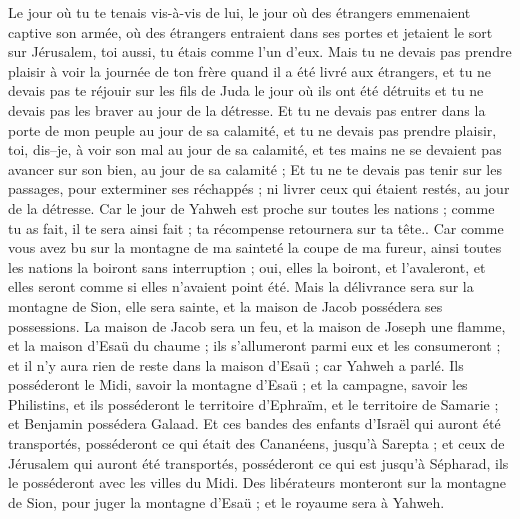 \begin{multicols}{2}
Le jour où tu te tenais vis-à-vis de lui, le jour où des étrangers emmenaient captive son armée, où des étrangers entraient dans ses portes et jetaient le sort sur Jérusalem, toi aussi, tu étais comme l'un d'eux.
Mais tu ne devais pas prendre plaisir à voir la journée de ton frère quand il a été livré aux étrangers, et tu ne devais pas te réjouir sur les fils de Juda le jour où ils ont été détruits et tu ne devais pas les braver au jour de la détresse.
Et tu ne devais pas entrer dans la porte de mon peuple au jour de sa calamité, et tu ne devais pas prendre plaisir, toi, dis–je, à voir son mal au jour de sa calamité, et tes mains ne se devaient pas avancer sur son bien, au jour de sa calamité ;
Et tu ne te devais pas tenir sur les passages, pour exterminer ses réchappés ; ni livrer ceux qui étaient restés, au jour de la détresse.
Car le jour de Yahweh est proche sur toutes les nations ; comme tu as fait, il te sera ainsi fait ; ta récompense retournera sur ta tête..
Car comme vous avez bu sur la montagne de ma sainteté la coupe de ma fureur, ainsi toutes les nations la boiront sans interruption ; oui, elles la boiront, et l'avaleront, et elles seront comme si elles n'avaient point été.
Mais la délivrance sera sur la montagne de Sion, elle sera sainte, et la maison de Jacob possédera ses possessions.
La maison de Jacob sera un feu, et la maison de Joseph une flamme, et la maison d'Esaü du chaume ; ils s'allumeront parmi eux et les consumeront ; et il n'y aura rien de reste dans la maison d'Esaü ; car Yahweh a parlé.
Ils posséderont le Midi, savoir la montagne d'Esaü ; et la campagne, savoir les Philistins, et ils posséderont le territoire d'Ephraïm, et le territoire de Samarie ; et Benjamin possédera Galaad.
Et ces bandes des enfants d'Israël qui auront été transportés, posséderont ce qui était des Cananéens, jusqu'à Sarepta ; et ceux de Jérusalem qui auront été transportés, posséderont ce qui est jusqu'à Sépharad, ils le posséderont avec les villes du Midi.
Des libérateurs monteront sur la montagne de Sion, pour juger la montagne d'Esaü ; et le royaume sera à Yahweh.
\PPE{}
\end{multicols}
